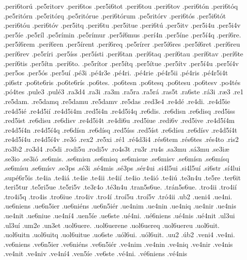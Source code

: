{.peri6tor^^fa
.pe5ritorv
.peri6tos
.per5i6tot
.peri6tou
.peri6tov
.peri6t^^f3n
.peri6t^^f3q
.pe5rit^^f3rn
.pe5rit^^f3rq
.pe5rit^^f3rue
.peri6t^^f3rum
.pe5rit^^f3rv
.peri6t^^f3s
.per5i6t^^f3t
.peri6t^^f3u
.peri6t^^f3v
.per5itq
.peri6tu
.per5itue
.peri6t^^fa
.per5itv
.per5i4u
.per5i4v
.per5^^ede
.pe5r^^edl
.pe5r^^edmin
.pe5r^^edmur
.per5^^ed6mus
.per^^ed4n
.per5^^edne
.per5^^ed4q
.per^^ed6re.
.per5^^ed6rem
.per^^ed6ren
.per5^^edrent
.per^^ed6req
.pe5r^^edrer
.per5^^ed6res
.per5^^ed6ret
.per^^ed6reu
.per^^ed6rev
.pe5r^^edri
.per5^^edss
.per5^^edsti
.per^^ed6tan
.per^^ed6taq
.per^^ed6tau
.per^^ed6tav
.per^^ed6te
.per^^ed6tis
.per5^^edtn
.per^^ed6to.
.pe5r^^edtor
.per5^^edtq
.per5^^edtue
.per5^^edtv
.per5^^ed4u
.per5^^ed4v
.per5os
.per5^^f3s
.per5u^^ed
.p^^e93i
.p^^e94r3e
.p^^e94ri.
.p^^e94rie
.p^^e94r5ii
.p^^e94ris
.p^^e94r5i4t
.pi6str
.po6te6ris
.po6te6r^^eds
.po6tes.
.po6tesn
.po6tesq
.po6tesu
.po6tesv
.po4t^^e9s
.p^^f34tes
.pule3
.pul^^e93
.ra3d4
.ra3i
.ra3m
.ra5ra
.ra5r^^e1
.ras5t
.ra6ste
.r^^e13i
.r^^e63
.re1
.re5dam.
.re5damq
.re5damu
.re5damv
.re5das
.red3e4
.re4d^^e9
.re4di.
.re4d5ie
.re4d5i^^e9
.re4d5i^^ed
.re4d5i4m
.red5i4n
.re4d5i4q
.re6dis.
.re6disn
.re6disq
.red5iss
.red5ist
.re6disu
.re6disv
.re4d5i4t
.re4di6u
.red5iue
.redi6v
.red5ive
.re4d5^^ed4m
.re4d5^^ed4n
.re4d5^^ed4q
.re6d^^edsn
.re6d^^edsq
.red5^^edss
.red5^^edst
.re6d^^edsu
.re6d^^edsv
.re4d5^^ed4t
.re4d5^^ed4u
.re4d5^^ed4v
.re3^^f3
.rex2
.re5xi
.r^^e91
.r^^e94d3i4
.r^^e9s6tem
.r^^e9s6tes
.r^^e9s4to
.ris2
.ro3b2
.ro3d4
.ro5di
.rodi5u
.rodi5v
.ro4s3t
.ru3r
.ru4s
.sa3mu
.s^^e13mu
.se3i^^e6
.se3io
.se3i^^f3
.se6mis.
.se6misn
.se6misq
.se6misue
.se6misv
.se6m^^edsn
.se6m^^edsq
.se6m^^edsu
.se6m^^edsv
.se3ps
.s^^e93i
.s^^e94mis
.s^^e93ps
.s^^e9r4ui
.si4l5ui
.si4l5u^^ed
.si6str
.s^^ed4lui
.sup^^e96r5is
.te4ia
.te4i^^e1
.te4ie
.te4ii
.te4i^^ed
.te4io
.te4i^^f3
.te4i^^fa
.te3n4u
.te5re
.ter6it
.teri5tur
.te5ri5ue
.te5ri5v
.te3r4o
.t^^e93n4u
.tran5s6ue.
.tr^^e1n5s6ue.
.tro4ii
.tro4i^^ed
.tro4i5q
.tro4is
.tro6iue
.tro4iv
.tro4^^ed
.tro^^ed5u
.tro^^ed5v
.tr^^f34ii
.ub2
.ueni4
.ue4ni.
.ue6niens
.ue6n5ier
.ue6ni^^e9ns
.ue6n5i^^e9r
.ue4nim
.ue4nin
.ue4niq
.ue4nir
.ue4nis
.ue4nit
.ue6niue
.ue4n^^ed4
.uen5^^ede
.ue6ste
.u^^e94ni.
.u^^e96niens
.u^^e94nis
.u^^e94nit
.ul3ui
.ul3u^^ed
.um2e
.un3et
.uol6uere.
.uol6uerene
.uol6uereq
.uol6uereu
.uol6uit.
.uol6uitn
.uol6uitq
.uol6uitue
.uo6ste
.u^^f3l6ui.
.u^^f3l6uit.
.uu2
.^^fab2
.veni4
.ve4ni.
.ve6niens
.ve6n5ier
.ve6ni^^e9ns
.ve6n5i^^e9r
.ve4nim
.ve4nin
.ve4niq
.ve4nir
.ve4nis
.ve4nit
.ve4niv
.ve4n^^ed4
.ven5^^ede
.ve6ste
.v^^e94ni.
.v^^e96niens
.v^^e94nis
}
